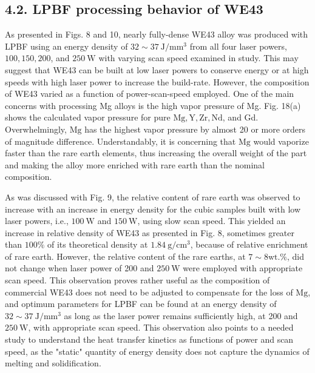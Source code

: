 \documentclass[10pt]{article}
\begin{document}
\subsection*{4.2. LPBF processing behavior of WE43}
As presented in Figs. 8 and 10, nearly fully-dense WE43 alloy was produced with LPBF using an energy density of $32 \sim 37 \mathrm{~J} / \mathrm{mm}^{3}$ from all four laser powers, $100,150,200$, and $250 \mathrm{~W}$ with varying scan speed examined in study. This may suggest that WE43 can be built at low laser powers to conserve energy or at high speeds with high laser power to increase the build-rate. However, the composition of WE43 varied as a function of power-scan-speed employed. One of the main concerns with processing Mg alloys is the high vapor pressure of Mg. Fig. 18(a) shows the calculated vapor pressure for pure $\mathrm{Mg}, \mathrm{Y}, \mathrm{Zr}, \mathrm{Nd}$, and Gd. Overwhelmingly, $\mathrm{Mg}$ has the highest vapor pressure by almost 20 or more orders of magnitude difference. Understandably, it is concerning that $\mathrm{Mg}$ would vaporize faster than the rare earth elements, thus increasing the overall weight of the part and making the alloy more enriched with rare earth than the nominal composition.

As was discussed with Fig. 9, the relative content of rare earth was observed to increase with an increase in energy density for the cubic samples built with low laser powers, i.e., $100 \mathrm{~W}$ and $150 \mathrm{~W}$, using slow scan speed. This yielded an increase in relative density of WE43 as presented in Fig. 8, sometimes greater than $100 \%$ of its theoretical density at $1.84 \mathrm{~g} / \mathrm{cm}^{3}$, because of relative enrichment of rare earth. However, the relative content of the rare earths, at $7 \sim 8 \mathrm{wt} . \%$, did not change when laser power of 200 and $250 \mathrm{~W}$ were employed with appropriate scan speed. This observation proves rather useful as the composition of commercial WE43 does not need to be adjusted to compensate for the loss of $\mathrm{Mg}$, and optimum parameters for LPBF can be found at an energy density of $32 \sim 37 \mathrm{~J} / \mathrm{mm}^{3}$ as long as the laser power remains sufficiently high, at 200 and $250 \mathrm{~W}$, with appropriate scan speed. This observation also points to a needed study to understand the heat transfer kinetics as functions of power and scan speed, as the "static" quantity of energy density does not capture the dynamics of melting and solidification.
\end{document}
